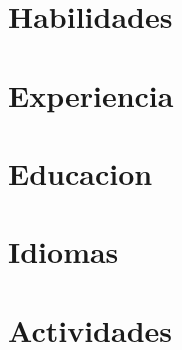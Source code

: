 \documentclass[letter,10pt]{article}
\begin{document}


\section{Habilidades}


\section{Experiencia}


\section{Educacion}


\section{Idiomas}



\section{Actividades}

\end{document}
